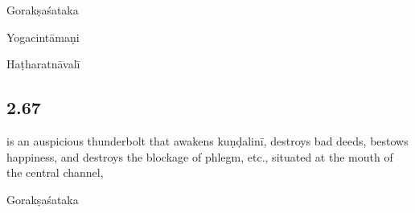 \begin{ekdosis}
\begin{translation}[hp02_066]
\end{translation}

\begin{sources}[hp02_066]
Gorakṣaśataka

\begin{versinnote}
\end{versinnote}
\end{sources}

\begin{testimonia}[hp02_066]
Yogacintāmaṇi

\begin{versinnote}
\end{versinnote}

Haṭharatnāvalī

\begin{versinnote}
\end{versinnote}
\end{testimonia}

\begin{philcomm}[hp02_066]
\end{philcomm}

\subsection*{2.67}
\begin{translation}[hp02_067]
is an auspicious thunderbolt that awakens kuṇḍalinī, destroys bad deeds, bestows happiness, and destroys the blockage of phlegm, etc., situated at the mouth of the central channel,
\end{translation}

\begin{sources}[hp02_067]
Gorakṣaśataka

\begin{versinnote}
\end{versinnote}
\end{sources}


\end{ekdosis}
